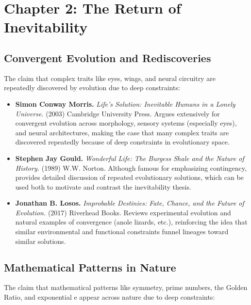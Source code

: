 \documentclass[
  openright]{book}
\begin{document}
\section{Chapter 2: The Return of
Inevitability}\label{chapter-2-the-return-of-inevitability}

\subsection{Convergent Evolution and
Rediscoveries}\label{convergent-evolution-and-rediscoveries}

The claim that complex traits like eyes, wings, and neural circuitry are
repeatedly discovered by evolution due to deep constraints:

\begin{itemize}
\item
  \textbf{Simon Conway Morris.} \emph{Life's Solution: Inevitable Humans
  in a Lonely Universe.} (2003) Cambridge University Press. Argues
  extensively for convergent evolution across morphology, sensory
  systems (especially eyes), and neural architectures, making the case
  that many complex traits are discovered repeatedly because of deep
  constraints in evolutionary space.
\item
  \textbf{Stephen Jay Gould.} \emph{Wonderful Life: The Burgess Shale
  and the Nature of History.} (1989) W.W. Norton. Although famous for
  emphasizing contingency, provides detailed discussion of repeated
  evolutionary solutions, which can be used both to motivate and
  contrast the inevitability thesis.
\item
  \textbf{Jonathan B. Losos.} \emph{Improbable Destinies: Fate, Chance,
  and the Future of Evolution.} (2017) Riverhead Books. Reviews
  experimental evolution and natural examples of convergence (anole
  lizards, etc.), reinforcing the idea that similar environmental and
  functional constraints funnel lineages toward similar solutions.
\end{itemize}

\subsection{Mathematical Patterns in
Nature}\label{mathematical-patterns-in-nature-1}

The claim that mathematical patterns like symmetry, prime numbers, the
Golden Ratio, and exponential e appear across nature due to deep
constraints:
\end{document}
